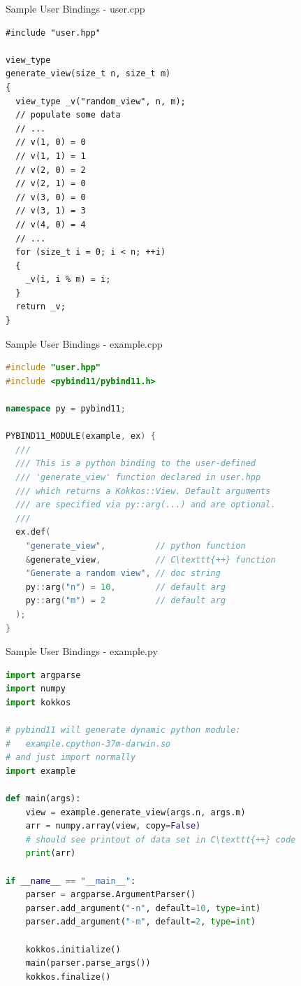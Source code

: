 \begin{frame}[fragile]{Sample User Bindings - user.cpp}
\begin{lstlisting}
#include "user.hpp"

view_type 
generate_view(size_t n, size_t m) 
{
  view_type _v("random_view", n, m);
  // populate some data
  // ...
  // v(1, 0) = 0
  // v(1, 1) = 1
  // v(2, 0) = 2
  // v(2, 1) = 0
  // v(3, 0) = 0
  // v(3, 1) = 3
  // v(4, 0) = 4
  // ...
  for (size_t i = 0; i < n; ++i) 
  {
    _v(i, i % m) = i;
  }
  return _v;
}
\end{lstlisting}
\end{frame}

\begin{frame}[fragile]{Sample User Bindings - example.cpp}
\begin{lstlisting}[language=C++,showstringspaces=false]
#include "user.hpp"
#include <pybind11/pybind11.h>

namespace py = pybind11;

PYBIND11_MODULE(example, ex) {
  ///
  /// This is a python binding to the user-defined
  /// 'generate_view' function declared in user.hpp
  /// which returns a Kokkos::View. Default arguments
  /// are specified via py::arg(...) and are optional.
  ///
  ex.def(
    "generate_view",          // python function
    &generate_view,           // C\texttt{++} function
    "Generate a random view", // doc string
    py::arg("n") = 10,        // default arg
    py::arg("m") = 2          // default arg
  );
}
\end{lstlisting}
\end{frame}

\begin{frame}[fragile]{Sample User Bindings - example.py}
\begin{lstlisting}[language=python]
import argparse
import numpy
import kokkos

# pybind11 will generate dynamic python module:
#   example.cpython-37m-darwin.so
# and just import normally
import example

def main(args):
    view = example.generate_view(args.n, args.m)
    arr = numpy.array(view, copy=False)
    # should see printout of data set in C\texttt{++} code
    print(arr)

if __name__ == "__main__":
    parser = argparse.ArgumentParser()
    parser.add_argument("-n", default=10, type=int)
    parser.add_argument("-m", default=2, type=int)

    kokkos.initialize()
    main(parser.parse_args())
    kokkos.finalize()
\end{lstlisting}
\end{frame}

